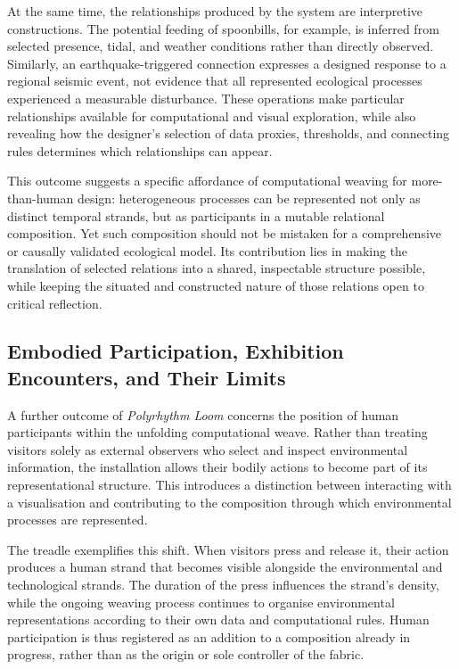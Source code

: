 \documentclass[manuscript,review,anonymous]{acmart}
\begin{document}
At the same time, the relationships produced by the system are interpretive constructions. The potential feeding of spoonbills, for example, is inferred from selected presence, tidal, and weather conditions rather than directly observed. Similarly, an earthquake-triggered connection expresses a designed response to a regional seismic event, not evidence that all represented ecological processes experienced a measurable disturbance. These operations make particular relationships available for computational and visual exploration, while also revealing how the designer's selection of data proxies, thresholds, and connecting rules determines which relationships can appear.

This outcome suggests a specific affordance of computational weaving for more-than-human design: heterogeneous processes can be represented not only as distinct temporal strands, but as participants in a mutable relational composition. Yet such composition should not be mistaken for a comprehensive or causally validated ecological model. Its contribution lies in making the translation of selected relations into a shared, inspectable structure possible, while keeping the situated and constructed nature of those relations open to critical reflection.

\subsection{Embodied Participation, Exhibition Encounters, and Their Limits}

A further outcome of \emph{Polyrhythm Loom} concerns the position of human participants within the unfolding computational weave. Rather than treating visitors solely as external observers who select and inspect environmental information, the installation allows their bodily actions to become part of its representational structure. This introduces a distinction between interacting with a visualisation and contributing to the composition through which environmental processes are represented.

The treadle exemplifies this shift. When visitors press and release it, their action produces a human strand that becomes visible alongside the environmental and technological strands. The duration of the press influences the strand's density, while the ongoing weaving process continues to organise environmental representations according to their own data and computational rules. Human participation is thus registered as an addition to a composition already in progress, rather than as the origin or sole controller of the fabric.
\end{document}
